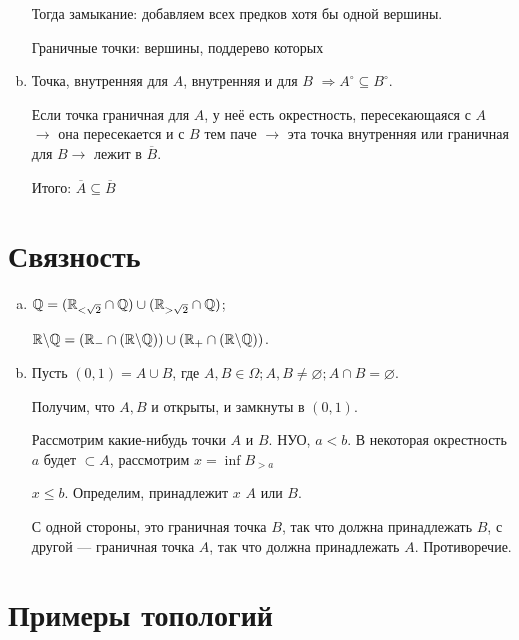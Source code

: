 \documentclass[12pt, a4paper]{article}
\begin{document}
\begin{enumerate}[(a)]
    Тогда замыкание: добавляем всех предков хотя бы одной вершины.

    Граничные точки: вершины, поддерево которых 

    \item Точка, внутренняя для $A$, внутренняя и для $B$ $\Rightarrow A^{\circ} \subseteq B^{\circ}$.
    
    Если точка граничная для $A$, у неё есть окрестность, пересекающаяся с $A$
    $→$ она пересекается и с $B$ тем паче $→$ эта точка внутренняя или граничная для $B → $ 
    лежит в $\overline{B}$.
    
    Итого: $\overline{A} \subseteq \overline{B}$
\end{enumerate}


\section{Связность}

\begin{enumerate}[(a)]
    \item ${\mathbb{Q}} = ({\mathbb{R}}_{< \sqrt{2}} \cap {\mathbb{Q}}) \cup ({\mathbb{R}}_{> \sqrt{2}} \cap {\mathbb{Q}})$;
    
    ${\mathbb{R}} \backslash {\mathbb{Q}} = ({\mathbb{R}}_{-} \cap ({\mathbb{R}} \backslash {\mathbb{Q}})) \cup ({\mathbb{R}}_{+} \cap ({\mathbb{R}} \backslash {\mathbb{Q}}))$.

    \item Пусть $(0, 1) = A \cup B$, где $A, B \in \Omega; A, B \neq \varnothing; A \cap B = \varnothing$.
    
    Получим, что $A, B$ и открыты, и замкнуты в $(0, 1)$.

    Рассмотрим какие-нибудь точки $A$ и $B$. НУО, $a < b$.
    В некоторая окрестность $a$ будет $\subset A$, рассмотрим $x = \inf B_{> a}$ %

    $x \leqslant b$. Определим, принадлежит $x$ $A$ или $B$.
    
    С одной стороны, это граничная точка $B$, так что должна принадлежать $B$, с другой — граничная точка $A$, так что должна принадлежать $A$. 
    Противоречие.
\end{enumerate}

\section{Примеры топологий}
\end{document}
